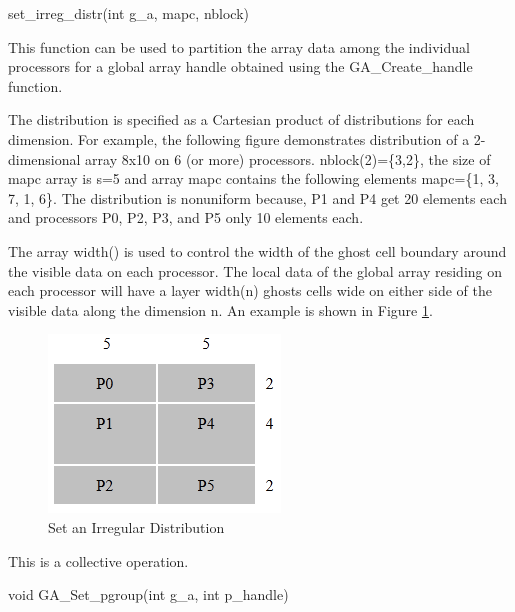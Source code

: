 \documentclass[12pt]{article}
\begin{document}
\begin{pyapi}
\begin{pycode}
set_irreg_distr(int g_a, mapc, nblock)
\end{pycode}
\end{pyapi}

\begin{desc}

  This function can be used to partition the array data among the
  individual processors for a global array handle obtained using the
  GA_Create_handle function.

  The distribution is specified as a Cartesian product of
  distributions for each dimension. For example, the following figure
  demonstrates distribution of a 2-dimensional array 8x10 on 6 (or
  more) processors. nblock(2)=\{3,2\}, the size of mapc array is s=5 and
  array mapc contains the following elements mapc=\{1, 3, 7, 1, 6\}. The
  distribution is nonuniform because, P1 and P4 get 20 elements each
  and processors P0, P2, P3, and P5 only 10 elements each.

  The array width() is used to control the width of the ghost cell
  boundary around the visible data on each processor. The local data
  of the global array residing on each processor will have a layer
  width(n) ghosts cells wide on either side of the visible data along
  the dimension n.
An example is shown in Figure \ref{setirregdist}.

\begin{figure}
\centering
\includegraphics{SetIrregDist}
\caption{Set an Irregular Distribution}
\label{setirregdist}
\end{figure}

  This is a collective operation.

\end{desc}


\begin{capi}
\begin{ccode}
void GA_Set_pgroup(int g_a, int p_handle)
\end{ccode}
\begin{funcargs}
\end{funcargs}
\end{capi}
\end{document}
